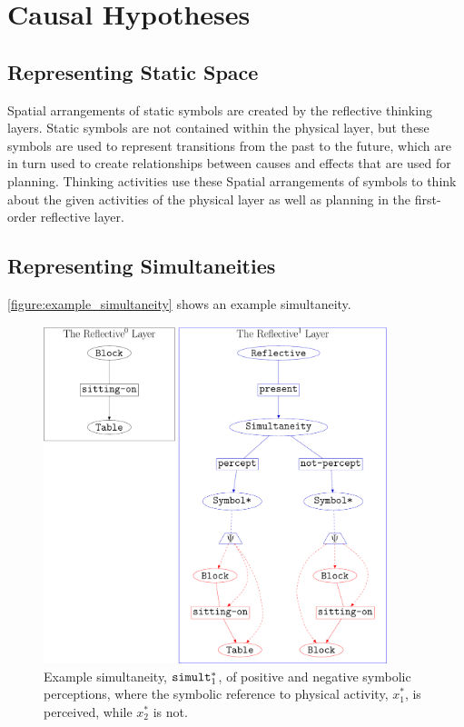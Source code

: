 \chapter{Causal Hypotheses}
\label{chapter:causal_hypotheses}

\section{Representing Static Space}

Spatial arrangements of static symbols are created by the reflective
thinking layers.  Static symbols are not contained within the physical
layer, but these symbols are used to represent transitions from the
past to the future, which are in turn used to create relationships
between causes and effects that are used for planning.  Thinking
activities use these Spatial arrangements of symbols to think about
the given activities of the physical layer as well as planning in the
first-order reflective layer.

\section{Representing Simultaneities}

{\mbox{\autoref{figure:example_simultaneity}}} shows an example
simultaneity.
\begin{figure}
\center
\includegraphics[width=10cm]{gfx/example_simultaneity}
\caption[Example simultaneity of positive and negative symbolic
  perceptions.]{Example simultaneity, $\text{\tt{simult}}_1^*$, of
  positive and negative symbolic perceptions, where the symbolic
  reference to physical activity, $x_1^*$, is perceived, while $x_2^*$
  is not.}
\label{figure:example_simultaneity}
\end{figure}

